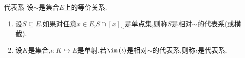 \begin{definition}{代表系}{}
	设$\sim$是集合$E$上的等价关系.
	\begin{enumerate}
		\item 设$S\subseteq E$.如果对任意$x\in E$,$S\cap\left[x\right]_{\sim}$是单点集,则称$S$是相对$\sim$的代表系(或横截).
		\item 设$K$是集合,$\iota:K\hookrightarrow E$是单射.若$\im\left(\iota\right)$是相对$\sim$的代表系,则称$\iota$是代表系.
	\end{enumerate}
\end{definition}




































